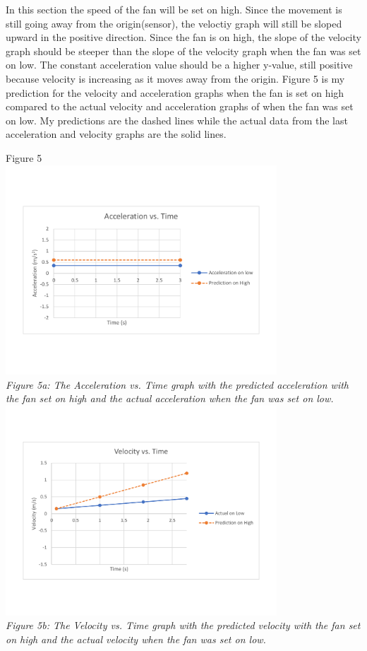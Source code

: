 \documentclass[aps,letterpaper,11pt]{revtex4}
\begin{document}
In this section the speed of the fan will be set on high. Since the movement is still going away from the origin(sensor), the veloctiy graph will still be sloped upward in the positive direction. Since the fan is on high, the slope of the velocity graph should be steeper than the slope of the velocity graph when the fan was set on low. The constant acceleration value should be a higher y-value, still positive because velocity is increasing as it moves away from the origin. Figure 5 is my prediction for the velocity and acceleration graphs when the fan is set on high compared to the actual velocity and acceleration graphs of when the fan was set on low. My predictions are the dashed lines while the actual data from the last acceleration and velocity graphs are the solid lines.

\begin{center}
Figure 5\\
\vspace{-10mm}
\includegraphics[width=4in]{PartAPredHighActLow.pdf}\\
\vspace{-10mm}
\textit{Figure 5a: The Acceleration vs. Time graph with the predicted acceleration with the fan set on high and the actual acceleration when the fan was set on low.}\\
\includegraphics[width=4in]{PartAPredHighActLowVel.pdf}\\
\vspace{-10mm}
\textit{Figure 5b: The Velocity vs. Time graph with the predicted velocity with the fan set on high and the actual velocity when the fan was set on low.}
\end{center}
\end{document}
